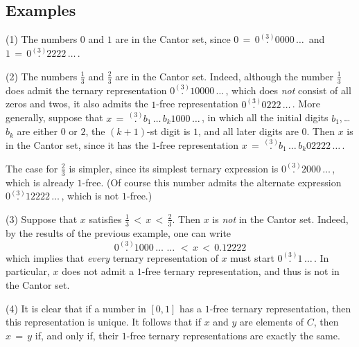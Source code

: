 {\V

        \subsection{\small{{\bf Examples}}}
        \label{ExampA20.105}

\hspace*{\parindent}(1) The numbers $0$ and $1$ are in the Cantor set, since $0 \,=\, 0\stackrel{(3)}{.}0000\,{\ldots}\,$ and $1 \,=\, 0\stackrel{(3)}{.}2222\,{\ldots}\,$.

\V

        (2) The numbers $\frac{1}{3}$ and $\frac{2}{3}$ are in the Cantor set.
    Indeed, although the number $\frac{1}{3}$ does admit the ternary representation $0\stackrel{(3)}{.}10000\,{\ldots}\,$,
    which does {\em not} consist of all zeros and twos, it also admits the $1$-free representation $0\stackrel{(3)}{.}0222\,{\ldots}\,$.
    More generally, suppose that $x \,=\, \stackrel{(3)}{.}b_{1}\,{\ldots}\,b_{k}1000\,{\ldots}\,$, in which all the initial digits
    $b_{1}$,\,{\ldots}\,$b_{k}$ are either $0$ or $2$, the $(k+1)$-st digit is $1$, and all later digits are $0$.
    Then $x$ is in the Cantor set, since it has the $1$-free representation $x \,=\, \stackrel{(3)}{.}b_{1}\,{\ldots}\,b_{k}02222\,{\ldots}\,$.

        The case for $\frac{2}{3}$ is simpler, since its simplest ternary expression is $0\stackrel{(3)}{.}2000\,{\ldots}\,$, which is already $1$-free.
    (Of course this number admits the alternate expression $0\stackrel{(3)}{.}12222\,{\ldots}\,$, which is not $1$-free.)

\V

        (3) Suppose that $x$ satisfies $\frac{1}{3}\,<\,x\,<\,\frac{2}{3}$.
    Then $x$ is {\em not} in the Cantor set.
    Indeed, by the results of the previous example, one can write
        \begin{displaymath}
        0\stackrel{(3)}{.}1000\,{\ldots}\,\,{\ldots}\,\,<\,x\,<\,0.12222
        \end{displaymath}
    which implies that {\em every} ternary representation of $x$ must start $0\stackrel{(3)}{.}1\,{\ldots}\,$.
    In particular, $x$ does not admit a $1$-free ternary representation, and thus is not in the Cantor set.

\V

        (4) It is clear that if a number in $[0,1]$ has a $1$-free ternary representation, then this representation is unique.
    It follows that if $x$ and $y$ are elements of $C$, then $x \,=\, y$ if, and only if, their $1$-free ternary representations are exactly the same.

}
